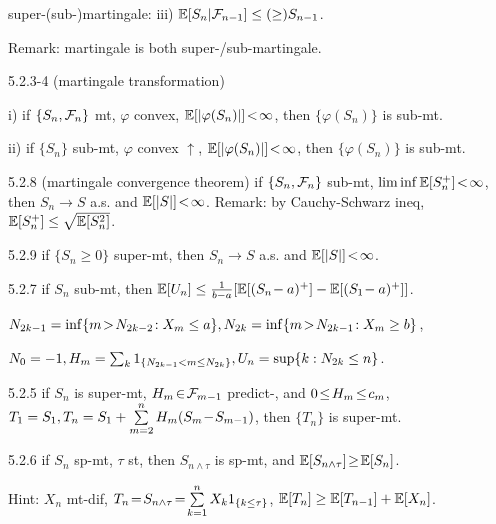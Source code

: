 \begin{defi}
    super-(sub-)martingale: iii) $\mathbb{E}[S_n \vert \mathcal{F}_{n-1}] \leq (\geq) S_{n-1}$.
    
    Remark: martingale is both super-/sub-martingale.
\end{defi}

\begin{thm}{5.2.3-4} (martingale transformation)
    
    i) if $\{S_n, \mathcal{F}_n\}$ mt, $\varphi$ convex, $\mathbb{E}[\lvert \varphi(S_n) \rvert] \!<\! \infty$, then $\{\varphi(S_n)\}$ is sub-mt.
    
    ii) if $\{S_n\}$ sub-mt, $\varphi$ convex $\uparrow$, $\mathbb{E}[\lvert \varphi(S_n) \rvert] \!<\! \infty$, then $\{\varphi(S_n)\}$ is sub-mt.
\end{thm}

\begin{thm}{5.2.8} (martingale convergence theorem)
    \newline
    if $\{S_n, \mathcal{F}_n\}$ sub-mt, $\liminf \mathbb{E}[S_n^+] \!<\! \infty$, then $S_n \rightarrow S$ a.s. and $\mathbb{E}[\lvert S \rvert] \!<\! \infty$.
    \newline
    Remark: by Cauchy-Schwarz ineq, $\mathbb{E}[S_n^+] \leq \sqrt{\mathbb{E}[S_n^2]}$.
\end{thm}

\begin{thm}{5.2.9}
    if $\{S_n \geq 0\}$ super-mt, then $S_n \rightarrow S$ a.s. and $\mathbb{E}[\lvert S \rvert] \!<\! \infty$.
\end{thm}

\begin{thm}{5.2.7}
    if $S_n$ sub-mt, then $\mathbb{E}[U_n] \leq \frac{1}{b-a} [\mathbb{E}[(S_n \!- a)^+] - \mathbb{E}[(S_1 \!- a)^+]]$.
    
    $N_{2k-1} = \inf\{m \!>\! N_{2k-2}\!: X_m \leq a\}, N_{2k} = \inf\{m \!>\! N_{2k-1}\!: X_m \geq b\}$,
    
    $N_0 = -1, H_m = \sum_k 1_{\{N_{2k-1}  < m \leq N_{2k}\}}, U_n = \sup \{k: N_{2k} \leq n\}$.
\end{thm}


\begin{thm}{5.2.5}
    if $S_n$ is super-mt, $H_m \!\in\! \mathcal{F}_{m-1}$ predict-, and $0 \!\leq\! H_m \!\leq\! c_m $,
    $T_1 = S_1, T_n = S_1 + \sum\limits_{m=2}^n H_m (S_m \!-\! S_{m-1})$, then $\{T_n\}$ is super-mt.
\end{thm}

\vspace{-1ex}\begin{thm}{5.2.6}
    if $S_n$ sp-mt, $\tau$ st, then $S_{n \wedge \tau}$ is sp-mt, and $\mathbb{E}[S_{n \wedge \tau}] \!\geq\! \mathbb{E}[S_n]$.
    
    \vspace{-1ex} Hint: $X_n$ mt-dif, $T_n \!=\! S_{n \wedge \tau} \!=\! \sum\limits_{k=1}^{n} X_{k} 1_{\{k \leq \tau\}}$, $\mathbb{E}[T_{n}] \geq \mathbb{E}[T_{n-1}] + \mathbb{E}[X_{n}]$.
\end{thm}

